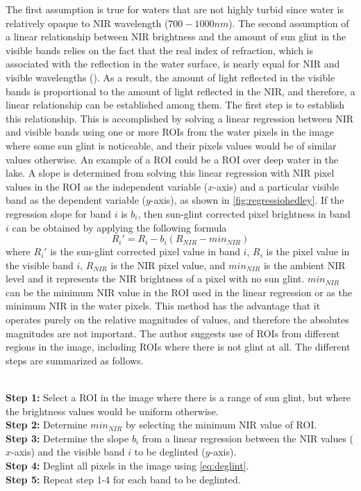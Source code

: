 The first assumption is true for waters that are not highly turbid since water is relatively opaque to NIR wavelength ($700-1000nm$). The second assumption of a linear relationship between NIR brightness and the amount of sun glint in the visible bands relies on the fact that the real index of refraction, which is associated with the reflection in the water surface, is nearly equal for NIR and visible wavelengths (\cite{Mobley1994}). As a result, the amount of light reflected in the visible bands is proportional to the amount of light reflected in the NIR, and therefore, a linear relationship can be established among them. The first step is to establish this relationship. This is accomplished by solving a linear regression between NIR and visible bands using one or more ROIs from the water pixels in the image where some sun glint is noticeable, and their pixels values would be of similar values otherwise. An example of a ROI could be a ROI over deep water in the lake. A slope is determined from solving this linear regression with NIR pixel values in the ROI as the independent variable ($x$-axis) and a particular visible band as the dependent variable ($y$-axis), as shown in \autoref{fig:regressiohedley}. If the regression slope for band $i$ is $b_i$, then sun-glint corrected pixel brightness in band $i$ can be obtained by applying the following formula
\begin{equation}\label{eq:deglint}
  R_i' = R_i - b_i(R_{NIR}-min_{NIR})
\end{equation}
where $R_i'$ is the sun-glint corrected pixel value in band $i$, $R_i$ is the pixel value in the visible band $i$, $R_{NIR}$ is the NIR pixel value, and $min_{NIR}$ is the ambient NIR level and it represents the NIR brightness of a pixel with no sun glint. $min_{NIR}$ can be the minimum NIR value in the ROI used in the linear regression or as the minimum NIR in the water pixels. This method has the advantage that it operates purely on the relative magnitudes of values, and therefore the absolutes magnitudes are not important. The author suggests use of ROIs from different regions in the image, including ROIs where there is not glint at all. The different steps are summarized as follows.

\\
{\bf Step 1:} Select a ROI in the image where there is a range of sun glint, but where the brightness values would be uniform otherwise.\\
{\bf Step 2:} Determine $min_{NIR}$ by selecting the minimum NIR value of ROI.\\
{\bf Step 3:} Determine the slope $b_i$ from a linear regression between the NIR values ($x$-axis) and the visible band $i$ to be deglinted ($y$-axis).\\
{\bf Step 4:} Deglint all pixels in the image using \autoref{eq:deglint}.\\
{\bf Step 5:} Repeat step 1-4 for each band to be deglinted.

